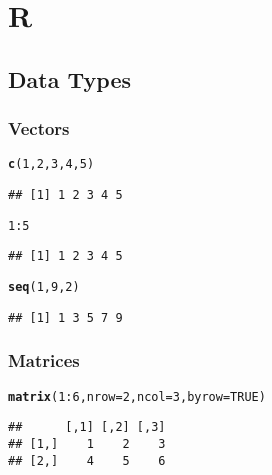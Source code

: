 \documentclass[../../dsa1101_notes.Rtex]{subfiles}\usepackage[]{graphicx}\usepackage[]{color}
\makeatletter
\newcommand{\hlnum}[1]{\textcolor[rgb]{0.686,0.059,0.569}{#1}}%
\newcommand{\hlopt}[1]{\textcolor[rgb]{0,0,0}{#1}}%
\newcommand{\hlstd}[1]{\textcolor[rgb]{0.345,0.345,0.345}{#1}}%
\newcommand{\hlkwc}[1]{\textcolor[rgb]{0.333,0.667,0.333}{#1}}%
\newcommand{\hlkwd}[1]{\textcolor[rgb]{0.737,0.353,0.396}{\textbf{#1}}}%
\newenvironment{kframe}{%
 \def\at@end@of@kframe{}%
 \ifinner\ifhmode%
  \def\at@end@of@kframe{\end{minipage}}%
  \begin{minipage}{\columnwidth}%
 \fi\fi%
 \def\FrameCommand##1{\hskip\@totalleftmargin \hskip-\fboxsep
 \colorbox{shadecolor}{##1}\hskip-\fboxsep
     \hskip-\linewidth \hskip-\@totalleftmargin \hskip\columnwidth}%
 \MakeFramed {\advance\hsize-\width
   \@totalleftmargin\z@ \linewidth\hsize
   \@setminipage}}%
 {\par\unskip\endMakeFramed%
 \at@end@of@kframe}
\newenvironment{knitrout}{}{} %
\makeatother
\begin{document}
\section{R}
\subsection{Data Types}
\subsubsection{Vectors}
\begin{knitrout}
\color{fgcolor}\begin{kframe}
\begin{alltt}
  \hlkwd{c}\hlstd{(}\hlnum{1}\hlstd{,}\hlnum{2}\hlstd{,}\hlnum{3}\hlstd{,}\hlnum{4}\hlstd{,}\hlnum{5}\hlstd{)}
\end{alltt}
\begin{verbatim}
## [1] 1 2 3 4 5
\end{verbatim}
\begin{alltt}
\hlnum{1}\hlopt{:}\hlnum{5}
\end{alltt}
\begin{verbatim}
## [1] 1 2 3 4 5
\end{verbatim}
\begin{alltt}
\hlkwd{seq}\hlstd{(}\hlnum{1}\hlstd{,}\hlnum{9}\hlstd{,}\hlnum{2}\hlstd{)}
\end{alltt}
\begin{verbatim}
## [1] 1 3 5 7 9
\end{verbatim}
\end{kframe}
\end{knitrout}
  
  \subsubsection{Matrices}
\begin{knitrout}
\color{fgcolor}\begin{kframe}
\begin{alltt}
  \hlkwd{matrix}\hlstd{(}\hlnum{1}\hlopt{:}\hlnum{6}\hlstd{,} \hlkwc{nrow} \hlstd{=} \hlnum{2}\hlstd{,} \hlkwc{ncol} \hlstd{=} \hlnum{3}\hlstd{,} \hlkwc{byrow} \hlstd{=} \hlnum{TRUE}\hlstd{)}
\end{alltt}
\begin{verbatim}
##      [,1] [,2] [,3]
## [1,]    1    2    3
## [2,]    4    5    6
\end{verbatim}
\end{kframe}
\end{knitrout}
  
\end{document}
